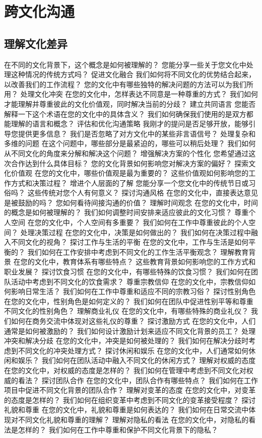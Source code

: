 \documentclass[12pt]{book}
\begin{document}
\section{跨文化沟通}
\subsection{理解文化差异}
在不同的文化背景下，这个概念是如何被理解的？
您能分享一些关于您文化中处理这种情况的传统方式吗？
促进文化融合
我们如何将不同文化的优势结合起来，以改善我们的工作流程？
您的文化中有哪些独特的解决问题的方法可以为我们所用？
处理文化冲突
在您的文化中，怎样表达不同意是一种尊重的方式？
我们如何才能理解并尊重彼此的文化价值观，同时解决当前的分歧？
建立共同语言
您能否解释一下这个术语在您的文化中的具体含义？
我们如何确保我们使用的是双方都能理解的语言和概念？
评估和优化沟通策略
我刚才的提问是否足够开放，能够引导您提供更多信息？
我们是否忽略了对方文化中的某些非言语信号？
处理复杂和多维的问题
在这个问题中，哪些部分是最紧迫的，哪些可以稍后处理？
我们如何从不同文化的角度来分解和解决这个问题？
增强解决方案的个性化
您希望通过这次合作达到什么具体目标？
您的文化背景如何影响您对解决方案的偏好？
探索文化价值观
在您的文化中，哪些价值观是最为重要的？
这些价值观如何影响您的工作方式和决策过程？
增进个人层面的了解
您能分享一个您文化中的传统节日或习俗吗？
这些传统对您个人有何意义？
探讨沟通风格
在您的文化中，直接表达意见是被鼓励的吗？
您如何看待间接沟通的价值？
理解时间观念
在您的文化中，时间的概念是如何被理解的？
我们如何调整时间安排来适应彼此的文化习惯？
尊重个人空间
在您的文化中，个人空间有多重要？
我们如何在工作中尊重彼此的个人空间？
处理决策过程
在您的文化中，决策是如何做出的？
我们如何在决策过程中融入不同文化的视角？
探讨工作与生活的平衡
在您的文化中，工作与生活是如何平衡的？
我们如何在工作安排中考虑到不同文化的工作生活平衡观念？
理解教育背景
在您的文化中，教育体系有哪些特点？
这些教育背景如何影响您的工作方式和职业发展？
探讨饮食习惯
在您的文化中，有哪些特殊的饮食习惯？
我们如何在团队活动中考虑到不同文化的饮食需求？
尊重宗教信仰
在您的文化中，宗教信仰如何影响日常生活？
我们如何在工作中尊重和适应不同的宗教习俗？
探讨性别角色
在您的文化中，性别角色是如何定义的？
我们如何在团队中促进性别平等和尊重不同文化的性别角色？
理解商业礼仪
在您的文化中，有哪些特殊的商业礼仪？
我们如何在商务交流中体现对这些礼仪的尊重？
探讨激励方式
在您的文化中，人们通常是如何被激励的？
我们如何设计激励计划来适应不同文化背景的员工？
处理冲突和解决分歧
在您的文化中，冲突是如何被处理的？
我们如何在解决分歧时考虑到不同文化的冲突处理方式？
探讨休闲和娱乐
在您的文化中，人们通常如何休闲和娱乐？
我们如何在团队活动中融入不同文化的休闲方式？
理解对权威的态度
在您的文化中，对权威的态度是怎样的？
我们如何在管理中考虑到不同文化对权威的看法？
探讨团队合作
在您的文化中，团队合作有哪些特点？
我们如何在工作项目中促进不同文化背景的团队合作？
理解对变革的态度
在您的文化中，对变革的态度是怎样的？
我们如何在组织变革中考虑到不同文化的变革接受程度？
探讨礼貌和尊重
在您的文化中，礼貌和尊重是如何表达的？
我们如何在日常交流中体现对不同文化礼貌和尊重的理解？
理解对隐私的看法
在您的文化中，对隐私的看法是怎样的？
我们如何在工作中尊重和保护不同文化背景下的隐私？
\end{document}
